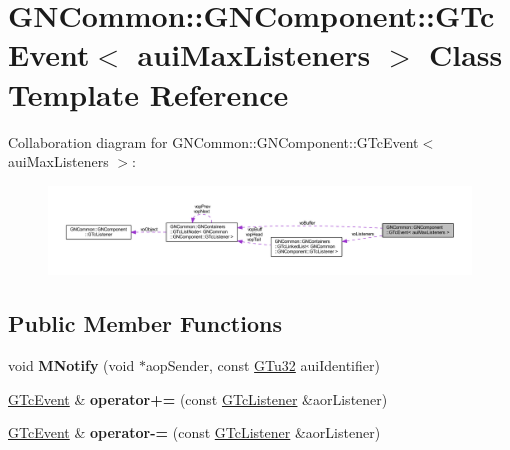 \hypertarget{class_g_n_common_1_1_g_n_component_1_1_g_tc_event}{}\section{G\+N\+Common\+:\+:G\+N\+Component\+:\+:G\+Tc\+Event$<$ aui\+Max\+Listeners $>$ Class Template Reference}
\label{class_g_n_common_1_1_g_n_component_1_1_g_tc_event}


Collaboration diagram for G\+N\+Common\+:\+:G\+N\+Component\+:\+:G\+Tc\+Event$<$ aui\+Max\+Listeners $>$\+:\nopagebreak
\begin{figure}[H]
\begin{center}
\leavevmode
\includegraphics[width=350pt]{class_g_n_common_1_1_g_n_component_1_1_g_tc_event__coll__graph}
\end{center}
\end{figure}
\subsection*{Public Member Functions}
\begin{DoxyCompactItemize}
\item 
\mbox{\label{class_g_n_common_1_1_g_n_component_1_1_g_tc_event_a61508ce090053f2b3085bb12a42c1256}} 
void {\bfseries M\+Notify} (void $\ast$aop\+Sender, const \mbox{\hyperlink{namespace_g_n_common_ae5485474bc8f23e462e920a17b377b53}{G\+Tu32}} aui\+Identifier)
\item 
\mbox{\label{class_g_n_common_1_1_g_n_component_1_1_g_tc_event_a2829cf154092d3c49fb543ef783a183c}} 
\mbox{\hyperlink{class_g_n_common_1_1_g_n_component_1_1_g_tc_event}{G\+Tc\+Event}} \& {\bfseries operator+=} (const \mbox{\hyperlink{class_g_n_common_1_1_g_n_component_1_1_g_tc_listener}{G\+Tc\+Listener}} \&aor\+Listener)
\item 
\mbox{\label{class_g_n_common_1_1_g_n_component_1_1_g_tc_event_a4ae57ee3fcb71ffb1320c73cb57cb426}} 
\mbox{\hyperlink{class_g_n_common_1_1_g_n_component_1_1_g_tc_event}{G\+Tc\+Event}} \& {\bfseries operator-\/=} (const \mbox{\hyperlink{class_g_n_common_1_1_g_n_component_1_1_g_tc_listener}{G\+Tc\+Listener}} \&aor\+Listener)
\end{DoxyCompactItemize}
